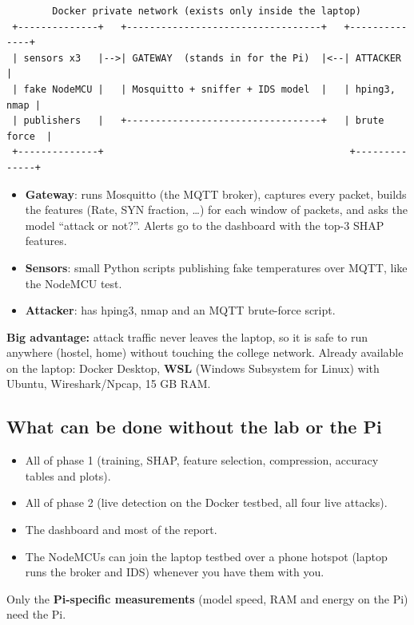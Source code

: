\documentclass[11pt]{article}
\begin{document}
\begin{verbatim}
        Docker private network (exists only inside the laptop)
 +--------------+   +----------------------------------+   +--------------+
 | sensors x3   |-->| GATEWAY  (stands in for the Pi)  |<--| ATTACKER     |
 | fake NodeMCU |   | Mosquitto + sniffer + IDS model  |   | hping3, nmap |
 | publishers   |   +----------------------------------+   | brute force  |
 +--------------+                                           +--------------+
\end{verbatim}
\begin{itemize}
\item \textbf{Gateway}: runs Mosquitto (the MQTT broker), captures every packet, builds the features (Rate, SYN fraction, \dots) for each window of packets, and asks the model ``attack or not?''. Alerts go to the dashboard with the top-3 SHAP features.
\item \textbf{Sensors}: small Python scripts publishing fake temperatures over MQTT, like the NodeMCU test.
\item \textbf{Attacker}: has hping3, nmap and an MQTT brute-force script.
\end{itemize}
\textbf{Big advantage:} attack traffic never leaves the laptop, so it is safe to run anywhere (hostel, home) without touching the college network.
Already available on the laptop: Docker Desktop, \textbf{WSL} (Windows Subsystem for Linux) with Ubuntu, Wireshark/Npcap, 15 GB RAM.

\subsection*{What can be done without the lab or the Pi}
\begin{itemize}
\item All of phase 1 (training, SHAP, feature selection, compression, accuracy tables and plots).
\item All of phase 2 (live detection on the Docker testbed, all four live attacks).
\item The dashboard and most of the report.
\item The NodeMCUs can join the laptop testbed over a phone hotspot (laptop runs the broker and IDS) whenever you have them with you.
\end{itemize}
Only the \textbf{Pi-specific measurements} (model speed, RAM and energy on the Pi) need the Pi.

\newpage
\end{document}
